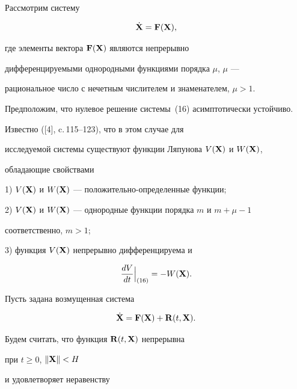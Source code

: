 Рассмотрим систему


\begin{equation}


\Dot {\bold X}=\bold F(\bold X),


\end{equation}


где элементы вектора $\bold F(\bold X)$ являются непрерывно


дифференцируемыми однородными функциями порядка $\mu$, $\mu$ ---


рациональное число с нечетным числителем и знаменателем, $\mu>1$.





Предположим, что нулевое решение системы~(16) асимптотически устойчиво.


Известно ([4], c.\,115--123), что в этом случае для


исследуемой системы существуют функции Ляпунова $V(\bold X)$ и $W(\bold X)$,


обладающие свойствами





1) $V(\bold X)$ и $W(\bold X)$ --- положительно-определенные функции;





2) $V(\bold X)$ и $W(\bold X)$ --- однородные функции порядка $m$ и $m+\mu-1$


соответственно, $m>1$;





3) функция $V(\bold X)$ непрерывно дифференцируема и


$$


\frac{dV}{dt} \Big|_{(16)} = -W(\bold X).


$$





Пусть задана возмущенная система


\begin{equation}


\Dot {\bold X}=\bold F(\bold X)+\bold R(t,\bold X).


\end{equation}


Будем считать, что функция $\bold R(t,\bold X)$ непрерывна


при $t\geq 0$, $\|\bold X\|< H$


и удовлетворяет неравенству


